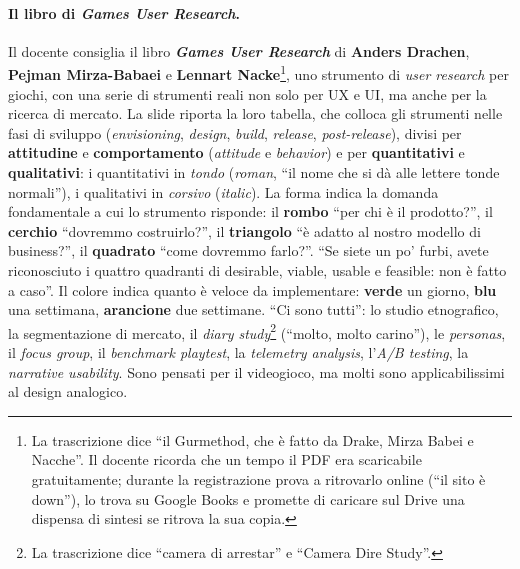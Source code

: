 \paragraph{Il libro di \emph{Games User Research}.} Il docente consiglia il libro
\textbf{\emph{Games User Research}} di \textbf{Anders Drachen}, \textbf{Pejman
Mirza-Babaei} e \textbf{Lennart Nacke}\footnote{La trascrizione dice ``il Gurmethod,
che è fatto da Drake, Mirza Babei e Nacche''. Il docente ricorda che un tempo il PDF era
scaricabile gratuitamente; durante la registrazione prova a ritrovarlo online (``il sito è
down''), lo trova su Google Books e promette di caricare sul Drive una dispensa di sintesi
se ritrova la sua copia.}, uno strumento di \emph{user research} per giochi, con una
serie di strumenti reali non solo per UX e UI, ma anche per la ricerca di mercato. La slide
riporta la loro tabella, che colloca gli strumenti nelle fasi di sviluppo
(\emph{envisioning}, \emph{design}, \emph{build}, \emph{release}, \emph{post-release}),
divisi per \textbf{attitudine} e \textbf{comportamento} (\emph{attitude} e
\emph{behavior}) e per \textbf{quantitativi} e \textbf{qualitativi}: i quantitativi in
\emph{tondo} (\emph{roman}, ``il nome che si dà alle lettere tonde normali''), i
qualitativi in \emph{corsivo} (\emph{italic}). La forma indica la domanda fondamentale a
cui lo strumento risponde: il \textbf{rombo} ``per chi è il prodotto?'', il
\textbf{cerchio} ``dovremmo costruirlo?'', il \textbf{triangolo} ``è adatto al nostro
modello di business?'', il \textbf{quadrato} ``come dovremmo farlo?''. ``Se siete un po'
furbi, avete riconosciuto i quattro quadranti di desirable, viable, usable e feasible: non
è fatto a caso''. Il colore indica quanto è veloce da implementare: \textbf{verde} un
giorno, \textbf{blu} una settimana, \textbf{arancione} due settimane. ``Ci sono tutti'':
lo studio etnografico, la segmentazione di mercato, il \emph{diary study}\footnote{La
trascrizione dice ``camera di arrestar'' e ``Camera Dire Study''.} (``molto, molto
carino''), le \emph{personas}, il \emph{focus group}, il \emph{benchmark playtest}, la
\emph{telemetry analysis}, l'\emph{A/B testing}, la \emph{narrative usability}. Sono
pensati per il videogioco, ma molti sono applicabilissimi al design analogico.


